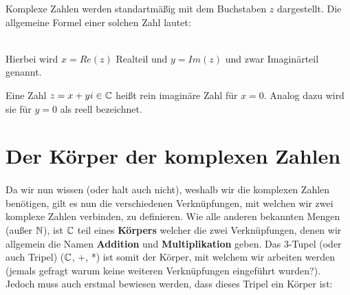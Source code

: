 	\begin{Definition}
		Komplexe Zahlen werden standartmäßig mit dem Buchstaben $z$ dargestellt. Die allgemeine Formel einer solchen Zahl lautet:
		\\
		\\
		Hierbei wird $x = Re(z)$ Realteil und $y = Im(z)$ und zwar  Imaginärteil genannt.
	\end{Definition}

	\begin{Bemerkung}
		Eine Zahl $z = x + yi \in \mathbb{C}$ heißt rein imaginäre Zahl für $x = 0$. Analog dazu wird sie für $y = 0$ als reell bezeichnet.
	\end{Bemerkung}


\section{Der Körper der komplexen Zahlen}

	\paragraph{} Da wir nun wissen (oder halt auch nicht), weshalb wir die komplexen Zahlen benötigen, gilt es nun die verschiedenen Verknüpfungen,
	mit welchen wir zwei komplexe Zahlen verbinden, zu definieren. Wie alle anderen bekannten Mengen (außer $\mathbb{N}$), ist $\mathbb{C}$ teil eines \textbf{Körpers}
	welcher die zwei Verknüpfungen, denen wir allgemein die Namen \textbf{Addition} und \textbf{Multiplikation} geben. Das 3-Tupel (oder auch Tripel)
	($\mathbb{C}$, +, *) ist somit der Körper, mit welchem wir arbeiten werden (jemals gefragt warum keine weiteren Verknüpfungen eingeführt wurden?).
	Jedoch muss auch erstmal bewiesen werden, dass dieses Tripel ein Körper ist:

